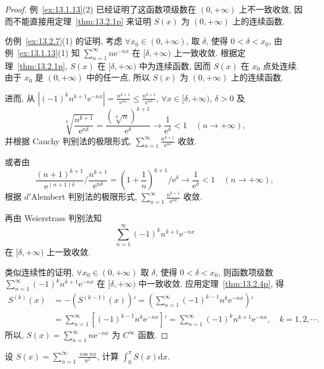 \begin{proof}
例~\ref{ex:13.1.13}(2) 已经证明了这函数项级数在 $(0,+\infty)$ 上不一致收敛, 因而不能直接用定理~\ref{thm:13.2.1p} 来证明 $S(x)$ 为 $(0,+\infty)$ 上的连续函数.

仿例~\ref{ex:13.2.7}(1) 的证明, 考虑 $\forall x_{0}\in(0,+\infty)$, 取 $\delta$, 使得 $0<\delta<x_{0}$, 由例~\ref{ex:13.1.13}(1) 知 $\sum_{n=1}^{\infty}n\mathrm{e}^{-nx}$ 在 $[\delta,+\infty)$ 上一致收敛. 根据定理~\ref{thm:13.2.1p}, $S(x)$ 在 $[\delta,+\infty)$ 中为连续函数, 因而 $S(x)$ 在 $x_{0}$ 点处连续. 由于 $x_{0}$ 是 $(0,+\infty)$ 中的任一点, 所以 $S(x)$ 为 $(0,+\infty)$ 上的连续函数.

进而, 从 $\left|(-1)^{k}n^{k+1}\mathrm{e}^{-nx}\right|=\frac{n^{k+1}}{\mathrm{e}^{nx}}\leqslant\frac{n^{k+1}}{\mathrm{e}^{n\delta}}$, $\forall x\in[\delta,+\infty)$, $\delta>0$ 及
\[
  \sqrt[n]{\frac{n^{k+1}}{\mathrm{e}^{n\delta}}}=\frac{(\sqrt[n]{n})^{k+1}}{\mathrm{e}^{\delta}}\to\frac{1}{\mathrm{e}^{\delta}}<1\quad(n\to+\infty),
\]
并根据 Cauchy 判别法的极限形式, $\sum_{n=1}^{\infty}\frac{n^{k+1}}{\mathrm{e}^{n\delta}}$ 收敛.

或者由
\[
  \frac{(n+1)^{k+1}}{\mathrm{e}^{(n+1)\delta}}\bigg/\frac{n^{k+1}}{\mathrm{e}^{n\delta}}=\left(1+\frac{1}{n}\right)^{k+1}\bigg/\mathrm{e}^{\delta}\to\frac{1}{\mathrm{e}^{\delta}}<1\quad(n\to+\infty),
\]
根据 $d'$Alembert 判别法的极限形式, $\sum_{n=1}^{\infty}\frac{n^{k+1}}{\mathrm{e}^{n\delta}}$ 收敛.

再由 Weierstrass 判别法知
\[
  \sum_{n=1}^{\infty}(-1)^{k}n^{k+1}\mathrm{e}^{-nx}
\]
在 $[\delta,+\infty)$ 上一致收敛.

类似连续性的证明, $\forall x_{0}\in(0,+\infty)$ 取 $\delta$, 使得 $0<\delta<x_{0}$, 则函数项级数 $\sum_{n=1}^{\infty}(-1)^{k}n^{k+1}\mathrm{e}^{-nx}$ 在 $[\delta,+\infty)$ 中一致收敛. 应用定理~\ref{thm:13.2.4p}, 得
\[
  \begin{aligned}
    S^{(k)}(x)&=-(S^{(k-1)}(x))'=\left(\sum_{n=1}^{\infty}(-1)^{k-1}n^{k}\mathrm{e}^{-nx}\right)'\\
    &=\sum_{n=1}^{\infty}[(-1)^{k-1}n^{k}\mathrm{e}^{-nx}]'=\sum_{n=1}^{\infty}(-1)^{k}n^{k+1}\mathrm{e}^{-nx},\quad k=1,2,\cdots.
  \end{aligned}
\]
所以, $S(x)=\sum_{n=1}^{\infty}n\mathrm{e}^{-nx}$ 为 $C^{\infty}$ 函数.
\end{proof}

\begin{example}\label{ex:13.2.10}
设 $S(x)=\sum_{n=1}^{\infty}\frac{\cos nx}{n^{2}}$, 计算 $\int_{0}^{\pi}S(x)\mathrm{d}x$.
\end{example}

